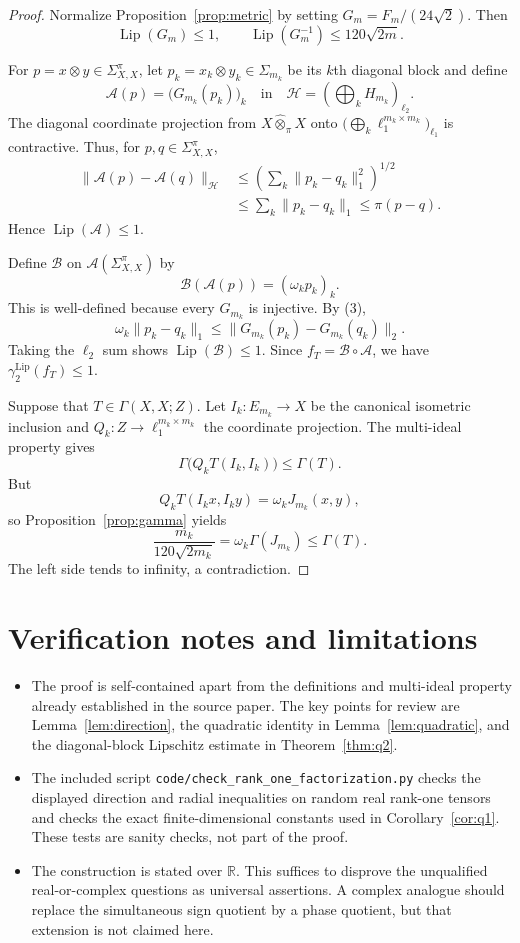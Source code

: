 \documentclass[11pt]{article}
\newcommand{\Lip}{\operatorname{Lip}}
\newcommand{\R}{\mathbb R}
\newcommand{\G}{\Gamma}
\newcommand{\gLip}{\gamma^{\mathrm{Lip}}_2}
\newcommand{\Sig}{\Sigma}
\begin{document}
\begin{proof}
Normalize Proposition~\ref{prop:metric} by setting
$G_m=F_m/(24\sqrt2)$.  Then
\[
 \Lip(G_m)\leq1,
 \qquad
 \Lip(G_m^{-1})\leq120\sqrt{2m}.                         \tag{3}
\]

For $p=x\otimes y\in\Sig_{X,X}^{\pi}$, let
$p_k=x_k\otimes y_k\in\Sig_{m_k}$ be its $k$th diagonal block and define
\[
 \mathcal A(p)=\bigl(G_{m_k}(p_k)\bigr)_k
 \quad\text{in}\quad
 \mathcal H=\left(\bigoplus_k H_{m_k}\right)_{\ell_2}.
\]
The diagonal coordinate projection from
$X\widehat\otimes_\pi X$ onto
$\bigl(\bigoplus_k\ell_1^{m_k\times m_k}\bigr)_{\ell_1}$ is contractive.
Thus, for $p,q\in\Sig_{X,X}^{\pi}$,
\begin{align*}
 \|\mathcal A(p)-\mathcal A(q)\|_{\mathcal H}
 &\leq\left(\sum_k\|p_k-q_k\|_1^2\right)^{1/2}\\
 &\leq\sum_k\|p_k-q_k\|_1
 \leq\pi(p-q).
\end{align*}
Hence $\Lip(\mathcal A)\leq1$.

Define $\mathcal B$ on $\mathcal A(\Sig_{X,X}^{\pi})$ by
\[
 \mathcal B(\mathcal A(p))=(\omega_kp_k)_k.
\]
This is well-defined because every $G_{m_k}$ is injective.  By (3),
\[
 \omega_k\|p_k-q_k\|_1
 \leq\|G_{m_k}(p_k)-G_{m_k}(q_k)\|_2.
\]
Taking the $\ell_2$ sum shows $\Lip(\mathcal B)\leq1$.  Since
$f_T=\mathcal B\circ\mathcal A$, we have $\gLip(f_T)\leq1$.

Suppose that $T\in\G(X,X;Z)$.  Let $I_k:E_{m_k}\to X$ be the canonical
isometric inclusion and $Q_k:Z\to\ell_1^{m_k\times m_k}$ the coordinate
projection.  The multi-ideal property gives
\[
 \G\bigl(Q_kT(I_k,I_k)\bigr)\leq\G(T).
\]
But
\[
 Q_kT(I_kx,I_ky)=\omega_kJ_{m_k}(x,y),
\]
so Proposition~\ref{prop:gamma} yields
\[
 \frac{m_k}{120\sqrt{2m_k}}
 =\omega_k\G(J_{m_k})
 \leq\G(T).
\]
The left side tends to infinity, a contradiction.
\end{proof}

\section{Verification notes and limitations}

\begin{itemize}
\item The proof is self-contained apart from the definitions and multi-ideal
property already established in the source paper.  The key points for review
are Lemma~\ref{lem:direction}, the quadratic identity in
Lemma~\ref{lem:quadratic}, and the diagonal-block Lipschitz estimate in
Theorem~\ref{thm:q2}.
\item The included script \texttt{code/check\_rank\_one\_factorization.py}
checks the displayed direction and radial inequalities on random real
rank-one tensors and checks the exact finite-dimensional constants used in
Corollary~\ref{cor:q1}.  These tests are sanity checks, not part of the proof.
\item The construction is stated over $\R$.  This suffices to disprove the
unqualified real-or-complex questions as universal assertions.  A complex
analogue should replace the simultaneous sign quotient by a phase quotient,
but that extension is not claimed here.
\end{itemize}
\end{document}
